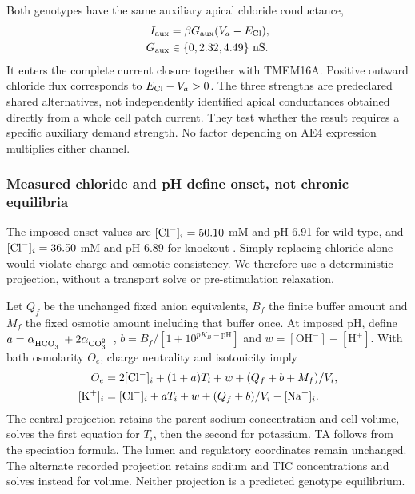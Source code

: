 Both genotypes have the same auxiliary apical chloride conductance,
\begin{equation}
\begin{aligned}
 I_{\rm aux}&=\beta G_{\rm aux}(V_a-E_{\rm Cl}),\\
 G_{\rm aux}&\in\{0,2.32,4.49\}\ {\rm nS}.
\end{aligned}
 \label{eq:shared-demand}
\end{equation}
It enters the complete current closure together with TMEM16A. Positive outward chloride flux corresponds to $E_{\rm Cl}-V_a>0$. The three strengths are predeclared shared alternatives, not independently identified apical conductances obtained directly from a whole cell patch current. They test whether the result requires a specific auxiliary demand strength. No factor depending on AE4 expression multiplies either channel.

\subsubsection{Measured chloride and pH define onset, not chronic equilibria}

The imposed onset values are $[\mathrm{Cl}^{-}]_i=50.10$ mM and pH 6.91 for wild type, and $[\mathrm{Cl}^{-}]_i=36.50$ mM and pH 6.89 for knockout \citep{Pena2015}. Simply replacing chloride alone would violate charge and osmotic consistency. We therefore use a deterministic projection, without a transport solve or pre-stimulation relaxation.

Let $Q_f$ be the unchanged fixed anion equivalents, $B_f$ the finite buffer amount and $M_f$ the fixed osmotic amount including that buffer once. At imposed pH, define $a=\alpha_{\mathrm{HCO}_{3}^{-}}+2\alpha_{\mathrm{CO}_{3}^{2-}}$, $b=B_f/[1+10^{pK_B-\mathrm{pH}}]$ and $w=[\mathrm{OH}^-]-[\mathrm H^+]$. With bath osmolarity $O_e$, charge neutrality and isotonicity imply
\begin{align}
 O_e&=2[\Cl]_i+(1+a)T_i+w+(Q_f+b+M_f)/V_i,\\
 [\K]_i&=[\Cl]_i+aT_i+w+(Q_f+b)/V_i-[\Na]_i.
 \label{eq:onset-projection}
\end{align}
The central projection retains the parent sodium concentration and cell volume, solves the first equation for $T_i$, then the second for potassium. TA follows from the speciation formula. The lumen and regulatory coordinates remain unchanged. The alternate recorded projection retains sodium and TIC concentrations and solves instead for volume. Neither projection is a predicted genotype equilibrium.

